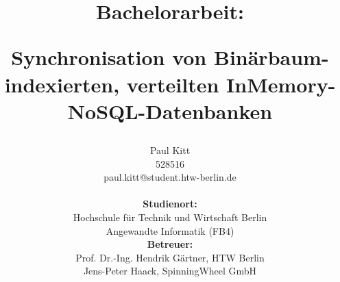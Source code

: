\documentclass[a4paper,11pt,oneside,%
headsepline,												%
footsepline,												%
bibtotocnumbered									%
]{scrreprt}
\begin{document}
\title{{\bf Bachelorarbeit:} \\ \begin{large}Synchronisation von Binärbaum-indexierten, verteilten
InMemory-NoSQL-Datenbanken\end{large}}
\author{
	Paul Kitt \\
	528516   \\	
	paul.kitt@student.htw-berlin.de	\\
\\
\textbf{Studienort:}	\\
	Hochschule für Technik und Wirtschaft Berlin \\
	Angewandte Informatik (FB4) \\
	\textbf{Betreuer:} \\
	Prof. Dr.-Ing. Hendrik Gärtner, HTW Berlin \\
	Jens-Peter Haack,  SpinningWheel GmbH
}
\end{document}
